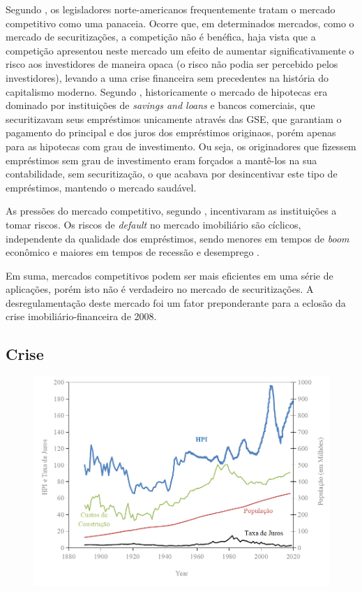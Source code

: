 \documentclass[
	12pt,				%
	oneside,			%
	a4paper,			%
	chapter=TITLE,		%
	section=TITLE,		%
	english,			%
	brazil				%
	]{abntex2}
\begin{document}
\begin{refsection}
Segundo \textcite[p.~213]{simkovic}, os legisladores norte-americanos frequentemente
tratam o mercado competitivo como uma panaceia. Ocorre que, em determinados
mercados, como o mercado de securitizações, a competição não é benéfica, haja
vista que a competição apresentou neste mercado um efeito de aumentar
significativamente o risco aos investidores de maneira opaca (o risco não podia
ser percebido pelos investidores), levando a uma crise financeira sem
precedentes na história do capitalismo moderno. Segundo \textcite{levitin2009},
historicamente o mercado de hipotecas era dominado por instituições de \emph{savings
and loans} e bancos comerciais, que securitizavam seus empréstimos unicamente
através das \gls{GSE}, que garantiam o pagamento do principal e dos juros dos
empréstimos originaos, porém apenas para as hipotecas com grau de investimento.
Ou seja, os originadores que fizessem empréstimos sem grau de investimento eram
forçados a mantê-los na sua contabilidade, sem securitização, o que acabava por
desincentivar este tipo de empréstimos, mantendo o mercado saudável.

As pressões do mercado competitivo, segundo \textcite[p.~216]{simkovic}, incentivaram as
instituições a tomar riscos. Os riscos de \emph{default} no mercado imobiliário são
cíclicos, independente da qualidade dos empréstimos, sendo menores em tempos de
\emph{boom} econômico e maiores em tempos de recessão e desemprego \autocite[ p.
228]{simkovic}.

Em suma, mercados competitivos podem ser mais eficientes em uma série de
aplicações, porém isto não é verdadeiro no mercado de securitizações. A
desregulamentação deste mercado foi um fator preponderante para a eclosão da
crise imobiliário-financeira de 2008.

\hypertarget{crise}{%
\subsection{Crise}\label{crise}}
\begin{figure}[H]

{\centering \includegraphics[width=0.7\linewidth]{images/shiller} 

}
\end{figure}
\end{refsection}
\end{document}
